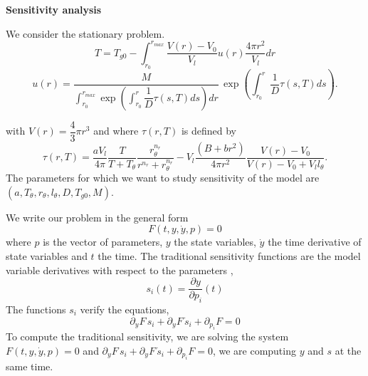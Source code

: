 \documentclass[11pt,a4paper]{article}
\begin{document}
\begin{center}
\large \textbf{Sensitivity analysis}
\end{center}

We consider the stationary problem. 
$$T = T_{g0} - \displaystyle  \int_{r_0}^{r_{max}} \dfrac{V(r) - V_0}{V_l} u(r) \dfrac{4\pi r^2}{V_l} dr$$
$$u(r) = \displaystyle \dfrac{M}{\displaystyle \int_{r_{0}}^{r_{max}} \exp  \left(\displaystyle  \int_{r_{0}}^{r} \dfrac{1}{D} \tau(s, T) ds \right) dr}  \, \exp \left(\displaystyle  \int_{r_{0}}^{r} \dfrac{1}{D} \tau(s, T) ds \right).$$

with $V(r) = \dfrac{4}{3} \pi r^3$ and where $\tau(r, T)$ is defined by 
$$\tau(r, T) = \dfrac{aV_l}{4\pi}  \dfrac{T}{T + T_{\theta}} \dfrac{r_{\theta}^{n_r}}{r^{n_r}+ r_{\theta}^{n_r}} - V_l \dfrac{(B + br^2)}{4\pi r^2} \dfrac{V(r) - V_0}{V(r) - V_0 + V_l  l_{\theta}}.$$
The parameters for which we want to study sensitivity of the model are $(a, T_{\theta}, r_{\theta}, l_{\theta}, D, T_{g0}, M)$. 

We write our problem in the general form
$$F(t, y, \dot{y}, p) = 0$$
where $p$ is the vector of parameters, $y$ the state variables, $\dot{y}$ the time derivative of state variables and $t$ the time. The traditional sensitivity functions are the model variable derivatives with respect to the parameters \citep{thomaseth.1999},
$$s_i(t) = \dfrac{\partial y}{\partial p_i} (t)$$
The functions $s_i$ verify the equations, 
$$\partial_y F \, s_i + \partial_{\dot{y}} F \, \dot{s}_i + \partial_{p_i} F = 0$$
To compute the traditional sensitivity, we are solving the system $F(t, y, \dot{y}, p) = 0$ and $\partial_y F \, s_i + \partial_{\dot{y}} F \, \dot{s}_i + \partial_{p_i} F = 0$, we are computing $y$ and $s$ at the same time. 
\end{document}

